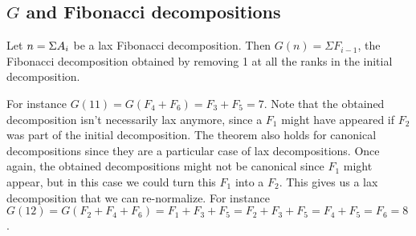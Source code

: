 \documentclass[a4paper,11pt]{article}
\begin{document}
\subsection{$G$ and Fibonacci decompositions}

\begin{theorem}\label{Gshift}
Let $n = \Sigma A_i$ be a lax Fibonacci decomposition.
Then $G(n) = \Sigma F_{i-1}$, the Fibonacci decomposition obtained
by removing 1 at all the ranks in the initial decomposition.
\end{theorem}

For instance $G(11) = G(F_4+F_6) = F_3 + F_5 = 7$. Note that the
obtained decomposition isn't necessarily lax anymore, since a
$F_1$ might have appeared if $F_2$ was part of the initial
decomposition. The theorem also holds for canonical decompositions
since they are a particular case of lax decompositions. Once again,
the obtained decompositions might not be canonical since $F_1$ might
appear, but in this case we could turn this $F_1$ into a $F_2$. This
gives us a lax decomposition that we can re-normalize. For
instance $G(12) = G(F_2+F_4+F_6) = F_1+F_3+F_5 = F_2+F_3+F_5 = F_4+F_5
= F_6 = 8$.
 
\end{document}
